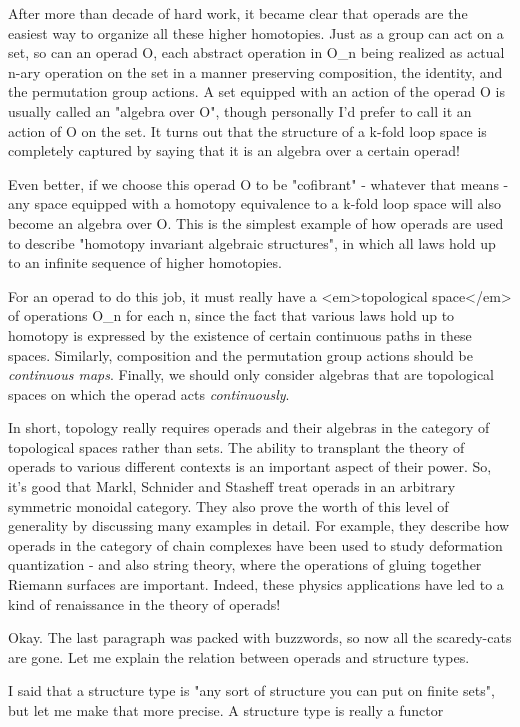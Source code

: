 After more than decade of hard work, it became clear that operads are
the easiest way to organize all these higher homotopies.  Just as a
group can act on a set, so can an operad O, each abstract operation 
in O_{n} being realized as actual n-ary operation on the set in a
manner preserving composition, the identity, and the permutation group
actions.  A set equipped with an action of the operad O is usually
called an "algebra over O", though personally I'd prefer to call
it an action of O on the set.  It turns out that the structure of a
k-fold loop space is completely captured by saying that it is an
algebra over a certain operad!  

Even better, if we choose this operad O to be "cofibrant" - whatever
that means - any space equipped with a homotopy equivalence to a k-fold 
loop space will also become an algebra over O.  This is the simplest 
example of how operads are used to describe "homotopy invariant algebraic 
structures", in which all laws hold up to an infinite sequence of higher 
homotopies.  


For an operad to do this job, it must really have a <em>topological
space</em> of operations O_{n} for each n, since the fact that
various laws hold up to homotopy is expressed by the existence of
certain continuous paths in these spaces.  Similarly, composition and
the permutation group actions should be \emph{continuous maps}.  Finally, we
should only consider algebras that are topological spaces on which the
operad acts \emph{continuously}.

In short, topology really requires operads and their algebras in the
category of topological spaces rather than sets.  The ability to
transplant the theory of operads to various different contexts is an
important aspect of their power.  So, it's good that Markl, Schnider
and Stasheff treat operads in an arbitrary symmetric monoidal category.  
They also prove the worth of this level of generality by discussing many 
examples in detail.  For example, they describe how operads in the category 
of chain complexes have been used to study deformation quantization - and 
also string theory, where the operations of gluing together Riemann 
surfaces are important.  Indeed, these physics applications have led to 
a kind of renaissance in the theory of operads!

Okay.  The last paragraph was packed with buzzwords, so now all
the scaredy-cats are gone.  Let me explain the relation between
operads and structure types.

I said that a structure type is "any sort of structure you can
put on finite sets", but let me make that more precise.  A structure
type is really a functor

